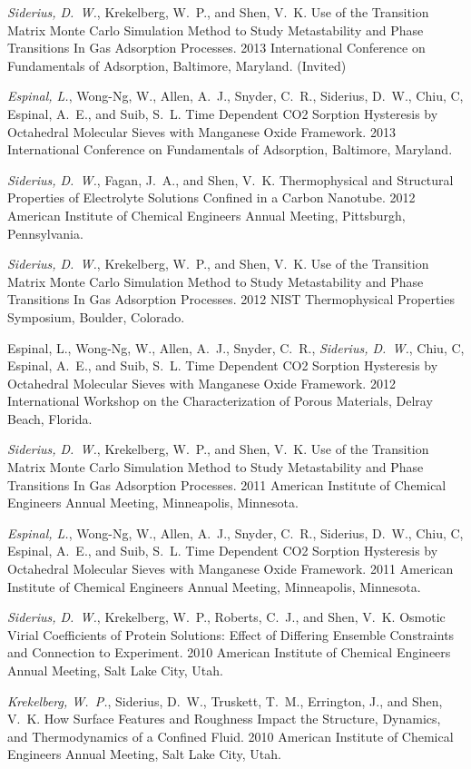 {\it Siderius, D.~W.}, Krekelberg, W.~P., and Shen, V.~K. Use of the Transition Matrix Monte Carlo Simulation Method to Study Metastability and Phase Transitions In Gas Adsorption Processes. 2013 International Conference on Fundamentals of Adsorption, Baltimore, Maryland. (Invited)

{\it Espinal, L.}, Wong-Ng, W., Allen, A.~J., Snyder, C.~R., Siderius, D.~W., Chiu, C, Espinal, A.~E., and Suib, S.~L. Time Dependent CO2 Sorption Hysteresis by Octahedral Molecular Sieves with Manganese Oxide Framework. 2013 International Conference on Fundamentals of Adsorption, Baltimore, Maryland.

{\it Siderius, D.~W.}, Fagan, J.~A., and Shen, V.~K. Thermophysical and Structural Properties of Electrolyte Solutions Confined in a Carbon Nanotube. 2012 American Institute of Chemical Engineers Annual Meeting, Pittsburgh, Pennsylvania.

{\it Siderius, D.~W.}, Krekelberg, W.~P., and Shen, V.~K. Use of the Transition Matrix Monte Carlo Simulation Method to Study Metastability and Phase Transitions In Gas Adsorption Processes. 2012 NIST Thermophysical Properties Symposium, Boulder, Colorado.

Espinal, L., Wong-Ng, W., Allen, A.~J., Snyder, C.~R., {\it Siderius, D.~W.}, Chiu, C, Espinal, A.~E., and Suib, S.~L. Time Dependent CO2 Sorption Hysteresis by Octahedral Molecular Sieves with Manganese Oxide Framework. 2012 International Workshop on the Characterization of Porous Materials, Delray Beach, Florida.

{\it Siderius, D.~W.}, Krekelberg, W.~P., and Shen, V.~K. Use of the Transition Matrix Monte Carlo Simulation Method to Study Metastability and Phase Transitions In Gas Adsorption Processes. 2011 American Institute of Chemical Engineers Annual Meeting, Minneapolis, Minnesota.

{\it Espinal, L.}, Wong-Ng, W., Allen, A.~J., Snyder, C.~R., Siderius, D.~W., Chiu, C, Espinal, A.~E., and Suib, S.~L. Time Dependent CO2 Sorption Hysteresis by Octahedral Molecular Sieves with Manganese Oxide Framework. 2011 American Institute of Chemical Engineers Annual Meeting, Minneapolis, Minnesota.

{\it Siderius, D.~W.}, Krekelberg, W.~P., Roberts, C.~J., and Shen, V.~K. Osmotic Virial Coefficients of Protein Solutions: Effect of Differing Ensemble Constraints and Connection to Experiment. 2010 American Institute of Chemical Engineers Annual Meeting, Salt Lake City, Utah.

{\it Krekelberg, W.~P.}, Siderius, D.~W., Truskett, T.~M., Errington, J., and Shen, V.~K. How Surface Features and Roughness Impact the Structure, Dynamics, and Thermodynamics of a Confined Fluid. 2010 American Institute of Chemical Engineers Annual Meeting, Salt Lake City, Utah.


